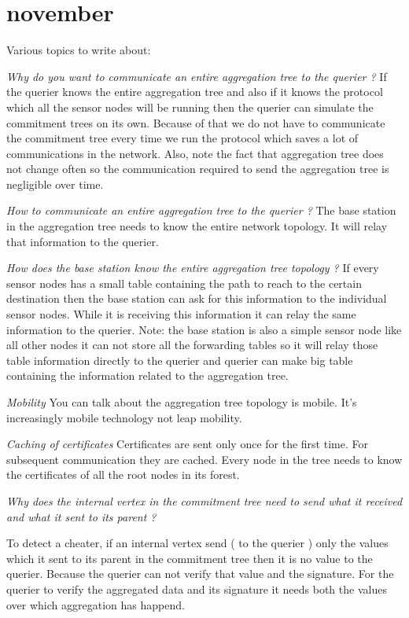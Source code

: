 \chapter{november}

Various topics to write about:

\textit{Why do you want to communicate an entire aggregation tree to the querier ?}
	If the querier knows the entire aggregation tree and also if it knows the protocol which all the sensor nodes will be running then the querier can simulate the commitment trees on its own. Because of that we do not have to communicate the commitment tree every time we run the protocol which saves a lot of communications in the network. Also, note the fact that aggregation tree does not change often so the communication required to send the aggregation tree is negligible over time.

\textit{How to communicate an entire aggregation tree to the querier ?}
	The base station in the aggregation tree needs to know the entire network topology.
	It will relay that information to the querier.

\textit{How does the base station know the entire aggregation tree topology ?}
	If every sensor nodes has a small table containing the path to reach to the certain destination then the base station can ask for this information to the individual sensor nodes. While it is receiving this information it can relay the same information to the querier. Note: the base station is also a simple sensor node like all other nodes it can not store all the forwarding tables so it will relay those table information directly to the querier and querier can make big table containing the information related to the aggregation tree.

\textit{Mobility}
	You can talk about the aggregation tree topology is mobile. It's increasingly mobile technology not leap mobility.

\textit{Caching of certificates}
		Certificates are sent only once for the first time. For subsequent communication they are cached. Every node in the tree needs to know the certificates of all the root nodes in its forest.

\textit{Why does the internal vertex in the commitment tree need to send what it received and what it sent to its parent ?}
	
	To detect a cheater, if an internal vertex send ( to the querier ) only the values which it sent to its parent in the commitment tree then it is no value to the querier. Because the querier can not verify that value and the signature. For the querier to verify the aggregated data and its signature it needs both the values over which aggregation has happend. 

